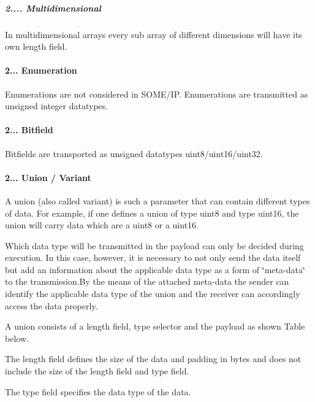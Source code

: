 \subparagraph*{2.... Multidimensional}


\begin{DoxyItemize}
\item In multidimensional arrays every sub array of different dimensions will have its own length field.
\end{DoxyItemize}

\paragraph*{2... Enumeration}


\begin{DoxyItemize}
\item Enumerations are not considered in S\+O\+M\+E/\+IP. Enumerations are transmitted as unsigned integer datatypes.
\end{DoxyItemize}

\paragraph*{2... Bitfield}


\begin{DoxyItemize}
\item Bitfields are transported as unsigned datatypes uint8/uint16/uint32.
\end{DoxyItemize}

\paragraph*{2... Union / Variant}


\begin{DoxyItemize}
\item A union (also called variant) is such a parameter that can contain different types of data. For example, if one defines a union of type uint8 and type uint16, the union will carry data which are a uint8 or a uint16.
\item Which data type will be transmitted in the payload can only be decided during execution. In this case, however, it is necessary to not only send the data itself but add an information about the applicable data type as a form of \char`\"{}meta-\/data\char`\"{} to the transmission.\+By the means of the attached meta-\/data the sender can identify the applicable data type of the union and the receiver can accordingly access the data properly.
\item A union consists of a length field, type selector and the payload as shown Table below. 
\item The length field defines the size of the data and padding in bytes and does not include the size of the length field and type field.
\item The type field specifies the data type of the data.
\end{DoxyItemize}

